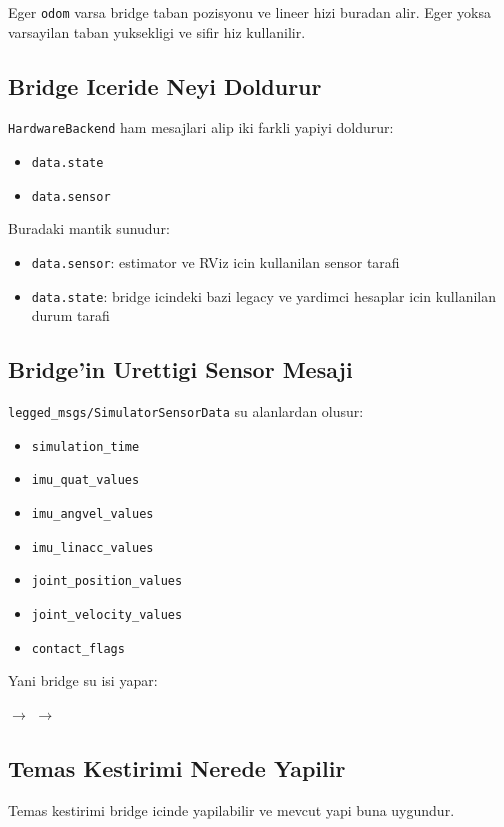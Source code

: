 \documentclass[11pt]{article}
\begin{document}
Eger \texttt{odom} varsa bridge taban pozisyonu ve lineer hizi buradan alir. Eger yoksa varsayilan taban yuksekligi ve sifir hiz kullanilir.

\subsection*{Bridge Iceride Neyi Doldurur}
\texttt{HardwareBackend} ham mesajlari alip iki farkli yapiyi doldurur:
\begin{itemize}
  \item \texttt{data.state}
  \item \texttt{data.sensor}
\end{itemize}

Buradaki mantik sunudur:
\begin{itemize}
  \item \texttt{data.sensor}: estimator ve RViz icin kullanilan sensor tarafi
  \item \texttt{data.state}: bridge icindeki bazi legacy ve yardimci hesaplar icin kullanilan durum tarafi
\end{itemize}

\subsection*{Bridge'in Urettigi Sensor Mesaji}
\texttt{legged\_msgs/SimulatorSensorData} su alanlardan olusur:
\begin{itemize}
  \item \texttt{simulation\_time}
  \item \texttt{imu\_quat\_values}
  \item \texttt{imu\_angvel\_values}
  \item \texttt{imu\_linacc\_values}
  \item \texttt{joint\_position\_values}
  \item \texttt{joint\_velocity\_values}
  \item \texttt{contact\_flags}
\end{itemize}

Yani bridge su isi yapar:
\begin{center}
$\rightarrow$
$\rightarrow$
\end{center}

\subsection*{Temas Kestirimi Nerede Yapilir}
Temas kestirimi bridge icinde yapilabilir ve mevcut yapi buna uygundur.
\end{document}
